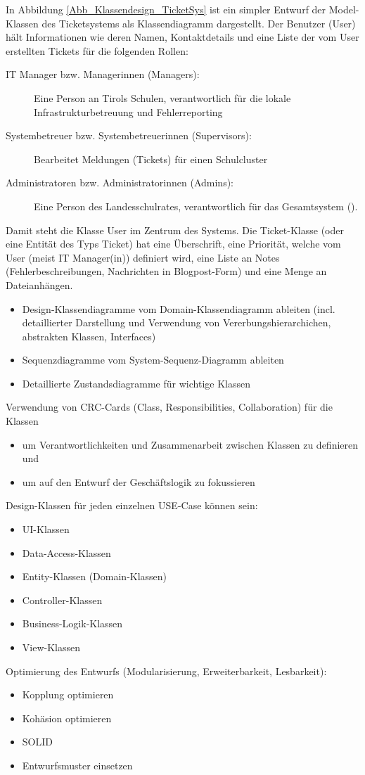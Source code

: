 In Abbildung \ref{Abb_Klassendesign_TicketSys} ist ein simpler Entwurf der Model-Klassen des Ticketsystems als Klassendiagramm dargestellt. Der Benutzer (User) hält Informationen wie deren Namen, Kontaktdetails und eine Liste der vom User erstellten Tickets für die folgenden Rollen:

\begin{description}
	\item[IT Manager bzw. Managerinnen (Managers):] Eine Person an Tirols Schulen, verantwortlich für die lokale Infrastrukturbetreuung und Fehlerreporting
	\item[Systembetreuer bzw. Systembetreuerinnen (Supervisors):] Bearbeitet Meldungen (Tickets) für einen Schulcluster
	\item[Administratoren bzw. Administratorinnen (Admins):] Eine Person des Landesschulrates, verantwortlich für das Gesamtsystem (\getHammerl).
\end{description}

Damit steht die Klasse User im Zentrum des Systems. Die Ticket-Klasse (oder eine Entität des Typs Ticket) hat eine Überschrift, eine Priorität, welche vom User (meist IT Manager(in)) definiert wird, eine Liste an Notes (Fehlerbeschreibungen, Nachrichten in Blogpost-Form) und eine Menge an Dateianhängen.

\newpage

\begin{itemize}
	\item Design-Klassendiagramme vom Domain-Klassendiagramm ableiten (incl. detaillierter Darstellung und Verwendung von Vererbungshierarchichen, abstrakten Klassen, Interfaces)
	\item Sequenzdiagramme vom System-Sequenz-Diagramm ableiten
	\item 	Detaillierte Zustandsdiagramme für wichtige Klassen
\end{itemize}

Verwendung von CRC-Cards (Class, Responsibilities, Collaboration) für die Klassen
\begin{itemize}
	\item um Verantwortlichkeiten und Zusammenarbeit zwischen Klassen zu definieren und
	\item um auf den Entwurf der Geschäftslogik zu fokussieren
\end{itemize}

Design-Klassen für jeden einzelnen USE-Case können sein:
\begin{itemize}
	\item UI-Klassen
	\item Data-Access-Klassen
	\item Entity-Klassen (Domain-Klassen)
	\item Controller-Klassen
	\item Business-Logik-Klassen
	\item View-Klassen
\end{itemize}

Optimierung des Entwurfs (Modularisierung, Erweiterbarkeit, Lesbarkeit):
\begin{itemize}
	\item Kopplung optimieren
	\item 	Kohäsion optimieren
	\item 	SOLID
	\item 	Entwurfsmuster einsetzen
\end{itemize}


\def \currentAuthor{Gabi Sorglos}
